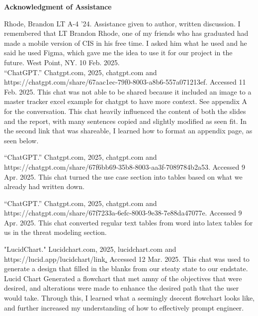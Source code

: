 \documentclass [11pt]{article}
\begin{document}
\begin{titlepage}
\begin{centering}
\textbf{Acknowledgment of Assistance} \vspace{1em}

\end{centering}

\noindent
Rhode, Brandon LT A-4 '24. Assistance given to author, written discussion. I remembered that LT Brandon Rhode, one of my friends who has graduated had made a mobile version of CIS in his free time. I asked him what he used and he said he used Figma, which gave me the idea to use it for our project in the future. West Point, NY. 10 Feb. 2025. \\

\noindent
“ChatGPT.” Chatgpt.com, 2025, chatgpt.com and https://chatgpt.com/share/67aac1ec-79f0-8003-a8b6-557a071213ef. Accessed 11 Feb. 2025. This chat was not able to be shared because it included an image to a master tracker excel example for chatgpt to have more context. See appendix A for the conversation. This chat heavily influenced the content of both the slides and the report, with many sentences copied and slightly modified as seen fit. In the second link that was shareable, I learned how to format an appendix page, as seen below.
\vspace{1em}

\noindent
“ChatGPT.” Chatgpt.com, 2025, chatgpt.com and https://chatgpt.com/share/67f6bb69-35b8-8003-aa3f-7089784b2a53. Accessed 9 Apr. 2025. This chat turned the use case section into tables based on what we already had written down.
\vspace{1em}

\noindent
“ChatGPT.” Chatgpt.com, 2025, chatgpt.com and https://chatgpt.com/share/67f7233a-6efc-8003-9e38-7e88da47077e. Accessed 9 Apr. 2025. This chat converted regular text tables from word into latex tables for us in the threat modeling section.
\vspace{1em}

\noindent
 "LucidChart." Lucidchart.com, 2025, lucidchart.com and https://lucid.app/lucidchart/link\href{https://lucid.app/lucidchart/69841c6c-e4ca-4909-a5d4-1d47f180a333/edit?viewport_loc=291%2C-4585%2C4803%2C2818%2C0_0&invitationId=inv_ee422065-cb83-4ba4-b033-1e0144dca9b2}. Accessed 12 Mar. 2025. This chat was used to generate a design that filled in the blanks from our steaty state to our endstate. Lucid Chart Generated a flowchart that met amny of the objectives that were desired, and alterations were made to enhance the desired path that the user would take. Through this, I learned what a seemingly dsecent flowchart looks like, and further increased my understanding of how to effectively prompt engineer.    
\vspace{1em}

\end{titlepage}
\end{document}
